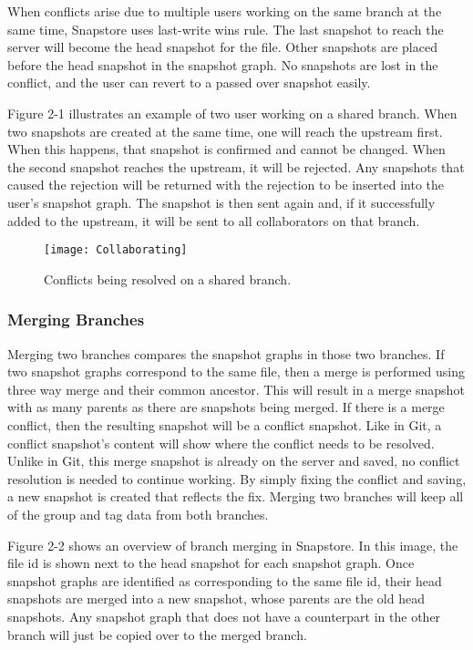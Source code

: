 When conflicts arise due to multiple users working on the same branch at the same time, Snapstore uses last-write wins rule. The last snapshot to reach the server will become the head snapshot for the file. Other snapshots are placed before the head snapshot in the snapshot graph. No snapshots are lost in the conflict, and the user can revert to a passed over snapshot easily.

Figure 2-1 illustrates an example of two user working on a shared branch. When two snapshots are created at the same time, one will reach the upstream first. When this happens, that snapshot is confirmed and cannot be changed. When the second snapshot reaches the upstream, it will be rejected. Any snapshots that caused the rejection will be returned with the rejection to be inserted into the user's snapshot graph. The snapshot is then sent again and, if it successfully added to the upstream, it will be sent to all collaborators on that branch.

\begin{figure}
\texttt{[image: Collaborating]}
\caption{Conflicts being resolved on a shared branch.}
\label{arm:fig1}
\end{figure}

\subsubsection{Merging Branches}

Merging two branches compares the snapshot graphs in those two branches. If two snapshot graphs correspond to the same file, then a merge is performed using three way merge and their common ancestor. This will result in a merge snapshot with as many parents as there are snapshots being merged. If there is a merge conflict, then the resulting snapshot will be a conflict snapshot. Like in Git, a conflict snapshot's content will show where the conflict needs to be resolved. Unlike in Git, this merge snapshot is already on the server and saved, no conflict resolution is needed to continue working. By simply fixing the conflict and saving, a new snapshot is created that reflects the fix. Merging two branches will keep all of the group and tag data from both branches.

Figure 2-2 shows an overview of branch merging in Snapstore. In this image, the file id is shown next to the head snapshot for each snapshot graph. Once snapshot graphs are identified as corresponding to the same file id, their head snapshots are merged into a new snapshot, whose parents are the old head snapshots. Any snapshot graph that does not have a counterpart in the other branch will just be copied over to the merged branch.

